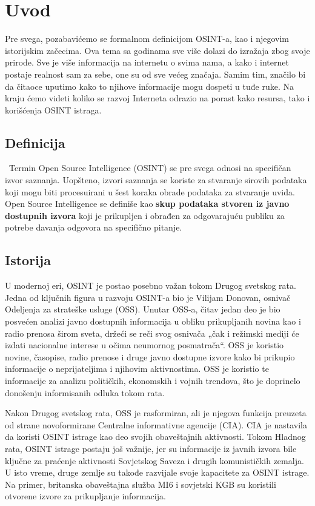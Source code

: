 \documentclass[fleqn, 12pt]{article}
\begin{document}

\setcounter{tocdepth}{2}
\tableofcontents
\newpage
\section{Uvod}
Pre svega, pozabavićemo se formalnom definicijom OSINT-a, kao i njegovim istorijskim začecima. Ova tema sa godinama sve više dolazi do izražaja zbog svoje prirode. Sve je više informacija na internetu o svima nama, a kako i internet postaje realnost sam za sebe, one su od sve većeg značaja. Samim tim, značilo bi da čitaoce uputimo kako to njihove informacije mogu dospeti u tuđe ruke. Na kraju ćemo videti koliko se razvoj Interneta odrazio na porast kako resursa, tako i korišćenja OSINT istraga. 

\subsection{Definicija}\
Termin Open Source Intelligence (OSINT) se pre svega odnosi na specifičan izvor saznanja. Uopšteno, izvori saznanja se koriste za stvaranje sirovih podataka koji mogu biti procesuirani u šest koraka obrade podataka za stvaranje uvida. Open Source Intelligence se definiše kao \textbf{skup podataka stvoren iz javno dostupnih izvora} koji je prikupljen i obrađen za odgovarajuću publiku za potrebe davanja odgovora na specifično pitanje.

\subsection{Istorija}
U modernoj eri, OSINT je postao posebno važan tokom Drugog svetskog rata. Jedna od ključnih figura u razvoju OSINT-a bio je Vilijam Donovan, osnivač Odeljenja za strateške usluge (OSS). Unutar OSS-a, čitav jedan deo je bio posvećen analizi javno dostupnih informacija u obliku prikupljanih novina kao i radio prenosa širom sveta, držeći se reči svog osnivača „čak i režimski mediji će izdati nacionalne interese u očima neumornog posmatrača“. OSS je koristio novine, časopise, radio prenose i druge javno dostupne izvore kako bi prikupio informacije o neprijateljima i njihovim aktivnostima. OSS je koristio te informacije za analizu političkih, ekonomskih i vojnih trendova, što je doprinelo donošenju informisanih odluka tokom rata. \newline


Nakon Drugog svetskog rata, OSS je rasformiran, ali je njegova funkcija preuzeta od strane novoformirane Centralne informativne agencije (CIA). CIA je nastavila da koristi OSINT istrage kao deo svojih obaveštajnih aktivnosti. Tokom Hladnog rata, OSINT istrage postaju još važnije, jer su informacije iz javnih izvora bile ključne za praćenje aktivnosti Sovjetskog Saveza i drugih komunističkih zemalja. U isto vreme, druge zemlje su takođe razvijale svoje kapacitete za OSINT istrage. Na primer, britanska obaveštajna služba MI6 i sovjetski KGB su koristili otvorene izvore za prikupljanje informacija.
\newpage
\end{document}
